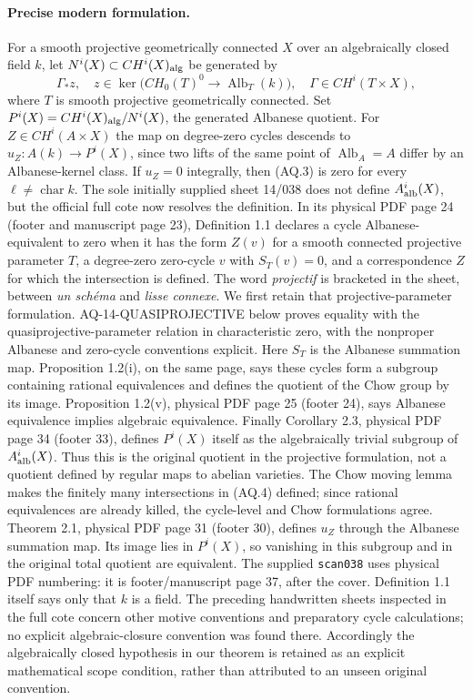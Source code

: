 \documentclass[11pt,a4paper]{article}
\theoremstyle{definition}\newtheorem{definition}[theorem]{Definition}
\theoremstyle{remark}\newtheorem{remark}[theorem]{Remark}
\begin{document}
\paragraph{Precise modern formulation.}
For a smooth projective geometrically connected $X$ over an
algebraically closed field $k$, let $N^i(X)\subset CH^i(X)_{\rm alg}$
be generated by
\[
 \Gamma_*z,\quad
 z\in\ker\bigl(CH_0(T)^0\longrightarrow\operatorname{Alb}_T(k)\bigr),
 \quad\Gamma\in CH^i(T\times X),                                \tag{AQ.4}
\]
where $T$ is smooth projective geometrically connected.
Set $P^i(X)=CH^i(X)_{\rm alg}/N^i(X)$, the generated Albanese
quotient. For $Z\in CH^i(A\times X)$
the map on degree-zero cycles descends to
$u_Z:A(k)\to P^i(X)$, since two lifts of the same point of
$\operatorname{Alb}_A=A$ differ by an Albanese-kernel class.
If $u_Z=0$ integrally, then (AQ.3) is zero for every
$\ell\ne\operatorname{char}k$.
The sole initially supplied sheet 14/038 does not define
$A^i_{\rm alb}(X)$, but the official full cote now resolves
the definition. In its physical PDF page 24 (footer and
manuscript page 23), Definition 1.1 declares a cycle
Albanese-equivalent to zero when it has the form
$Z(v)$ for a smooth connected projective parameter $T$,
a degree-zero zero-cycle $v$ with $S_T(v)=0$, and a
correspondence $Z$ for which the intersection is defined.
The word \emph{projectif} is bracketed in the sheet,
between \emph{un sch\'ema} and \emph{lisse connexe}.
We first retain that projective-parameter formulation.
AQ-14-QUASIPROJECTIVE below proves equality with the
quasiprojective-parameter relation in characteristic zero,
with the nonproper Albanese and zero-cycle conventions explicit.
Here $S_T$ is the Albanese summation map.
Proposition 1.2(i), on the same page, says these cycles
form a subgroup containing rational equivalences and
defines the quotient of the Chow group by its image.
Proposition 1.2(v), physical PDF page 25 (footer 24),
says Albanese equivalence implies algebraic equivalence.
Finally Corollary 2.3, physical PDF page 34 (footer 33),
defines $P^i(X)$ itself as the algebraically trivial
subgroup of $A^i_{\rm alb}(X)$. Thus this is the
original quotient in the projective formulation,
not a quotient defined by regular maps to abelian
varieties. The Chow moving lemma makes the finitely
many intersections in (AQ.4) defined; since rational
equivalences are already killed, the cycle-level and
Chow formulations agree. Theorem 2.1, physical PDF
page 31 (footer 30), defines $u_Z$ through the
Albanese summation map. Its image lies in $P^i(X)$,
so vanishing in this subgroup and in the original
total quotient are equivalent. The supplied
\nolinkurl{scan038} uses physical PDF numbering:
it is footer/manuscript page 37, after the cover.
Definition 1.1 itself says only that $k$ is a field.
The preceding handwritten sheets inspected in the full
cote concern other motive conventions and preparatory
cycle calculations; no explicit algebraic-closure
convention was found there. Accordingly the
algebraically closed hypothesis in our theorem is
retained as an explicit mathematical scope condition,
rather than attributed to an unseen original convention.
\end{document}
